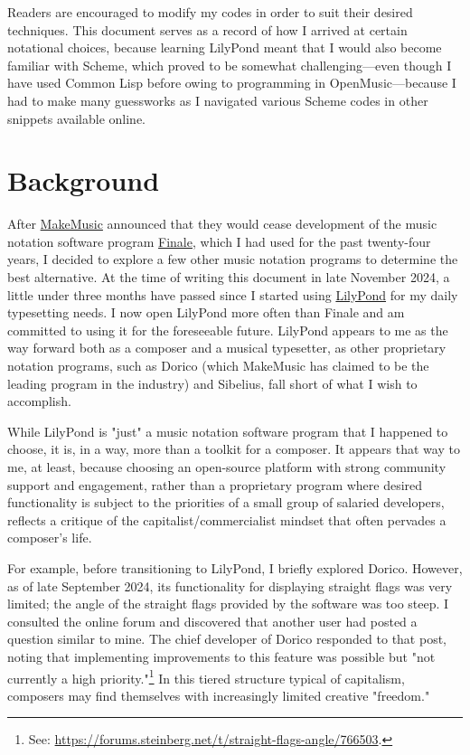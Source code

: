 \documentclass[11pt, oneside]{book}   	%
\begin{document}
Readers are encouraged to modify my codes in order to suit their desired techniques. This document serves as a record of how I arrived at certain notational choices, because learning LilyPond meant that I would also become familiar with Scheme, which proved to be somewhat challenging—even though I have used Common Lisp before owing to programming in OpenMusic—because I had to make many guessworks as I navigated various Scheme codes in other snippets available online. 
\section{Background}

After \href{https://www.makemusic.com/}{MakeMusic} announced that they would cease development of the music notation software program \href{https://www.finalemusic.com/}{Finale}, which I had used for the past twenty-four years, I decided to explore a few other music notation programs to determine the best alternative. At the time of writing this document in late November 2024, a little under three months have passed since I started using \href{https://lilypond.org/}{LilyPond} for my daily typesetting needs. I now open LilyPond more often than Finale and am committed to using it for the foreseeable future. LilyPond appears to me as the way forward both as a composer and a musical typesetter, as other proprietary notation programs, such as Dorico (which MakeMusic has claimed to be the leading program in the industry) and Sibelius, fall short of what I wish to accomplish. 

While LilyPond is "just" a music notation software program that I happened to choose, it is, in a way, more than a toolkit for a composer. It appears that way to me, at least, because choosing an open-source platform with strong community support and engagement, rather than a proprietary program where desired functionality is subject to the priorities of a small group of salaried developers, reflects a critique of the capitalist/commercialist mindset that often pervades a composer’s life.
  
For example, before transitioning to LilyPond, I briefly explored Dorico. However, as of late September 2024, its functionality for displaying straight flags was very limited; the angle of the straight flags provided by the software was too steep. I consulted the online forum and discovered that another user had posted a question similar to mine. The chief developer of Dorico responded to that post, noting that implementing improvements to this feature was possible but "not currently a high priority."\footnote{See: \url{https://forums.steinberg.net/t/straight-flags-angle/766503}.} In this tiered structure typical of capitalism, composers may find themselves with increasingly limited creative "freedom." 
\end{document}
